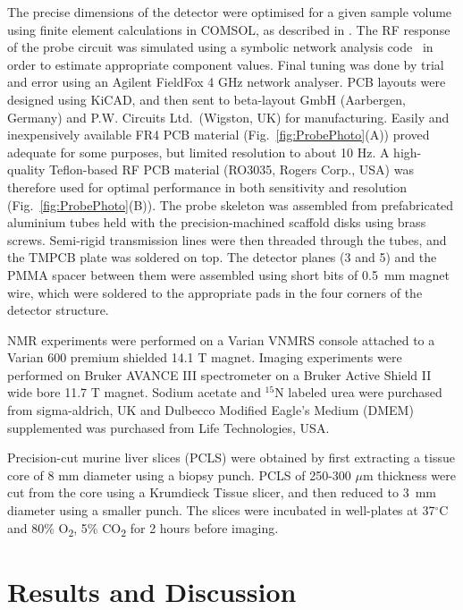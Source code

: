 \documentclass[preprint,5p]{elsarticle}
\newcommand{\fig}[1]{Fig.~\ref{#1}}
\begin{document}
The precise dimensions of the detector were optimised for a given sample volume using 
finite element calculations in COMSOL, as described in \cite{gream_2016}. 
The RF response of the probe circuit was simulated using a symbolic  
network analysis code~\cite{gream-thesis} in order to estimate appropriate component values. Final tuning
was done by trial and error using an Agilent FieldFox 4 GHz network analyser. 
PCB layouts were designed using KiCAD, and then sent to
beta-layout GmbH (Aarbergen, Germany) and P.W. Circuits Ltd.~(Wigston, UK) 
for manufacturing. Easily and inexpensively available FR4 PCB material
(\fig{fig:ProbePhoto}(A)) proved adequate for some purposes, but limited resolution to about 10 Hz.
A high-quality Teflon-based RF PCB material (RO3035, Rogers Corp., USA) was therefore used for optimal 
performance in both sensitivity and resolution (\fig{fig:ProbePhoto}(B)).
The probe skeleton was assembled from prefabricated aluminium tubes held with the precision-machined scaffold
disks using brass screws. Semi-rigid transmission lines were then threaded through the tubes, and the TMPCB plate was 
soldered on top. The detector planes (3 and 5) and the PMMA spacer between them were assembled using short bits
of 0.5~mm magnet wire, which were soldered to the appropriate pads in the four corners of the detector structure.

NMR experiments were performed on a Varian VNMRS console attached to a Varian 600 premium shielded 14.1 T magnet.  
Imaging experiments were performed on Bruker AVANCE III spectrometer on a Bruker Active Shield II wide bore 11.7 T 
magnet. 
Sodium acetate and $^{15}$N labeled urea were purchased from sigma-aldrich, UK and Dulbecco Modified Eagle's Medium (DMEM) supplemented was purchased from Life Technologies, USA.

Precision-cut murine liver slices (PCLS) were obtained by first extracting a tissue core of 8 mm diameter 
using a biopsy punch. PCLS of 250-300 $\mu$m thickness were cut from the core using a Krumdieck Tissue slicer, 
and then reduced to 3~mm diameter using a smaller punch. The slices were incubated in well-plates at 37$^\circ$C and 80\%
O\textsubscript{2}, 5\% CO\textsubscript{2}
for 2 hours before imaging.


\section{Results and Discussion}
\end{document}
